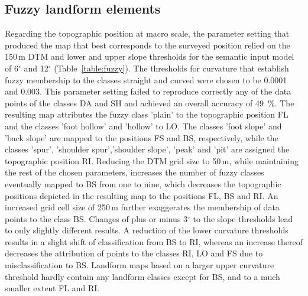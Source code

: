 \documentclass[preprint,12pt,authoryear]{elsarticle}
\begin{document}
\subsection{Fuzzy landform elements}
Regarding the topographic position at macro scale, the parameter setting that produced the map that best corresponds to the surveyed position relied on the 150\,m DTM and lower and upper slope thresholds for the semantic input model of 6$^{\circ}$ and 12$^{\circ}$ (Table~\ref{table:fuzzy}). The thresholds for curvature that establish fuzzy membership to the classes straight and curved were chosen to be 0.0001 and 0.003. This parameter setting failed to reproduce correctly any of the data points of the classes DA and SH and achieved an overall accuracy of 49~\%. The resulting map attributes the fuzzy class 'plain' to the topographic position FL and the classes 'foot hollow' and 'hollow' to LO. The classes 'foot slope' and 'back slope' are mapped to the positions FS and BS, respectively, while the classes 'spur', 'shoulder spur','shoulder slope', 'peak' and 'pit' are assigned the topographic position RI. Reducing the DTM grid size to 50\,m, while maintaining the rest of the chosen parameters, increases the number of fuzzy classes eventually mapped to BS from one to nine, which decreases the topographic positions depicted in the resulting map to the positions FL, BS and RI. An increased grid cell size of 250\,m further exaggerates the membership of data points to the class BS. Changes of plus or minus 3$^{\circ}$ to the slope thresholds lead to only slightly different results. A reduction of the lower curvature thresholds results in a slight shift of classification from BS to RI, whereas an increase thereof decreases the attribution of points to the classes RI, LO and FS due to misclassification to BS. Landform maps based on a larger upper curvature threshold hardly contain any landform classes except for BS, and to a much smaller extent FL and RI.
\end{document}
